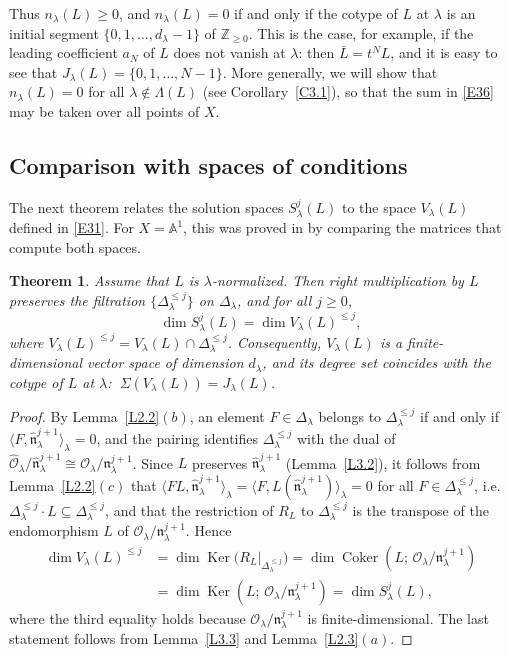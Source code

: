 \documentclass[11pt,reqno]{amsart}
\theoremstyle{plain}
\newtheorem{theorem}{Theorem}[section]
\theoremstyle{definition}
\theoremstyle{remark}
\numberwithin{equation}{section}
\newcommand{\cO}{\mathcal{O}}
\newcommand{\Z}{\mathbb{Z}}
\newcommand{\A}{\mathbb{A}}
\newcommand{\fn}{\mathfrak{n}}
\newcommand{\nl}{\mathfrak{n}_\lambda}
\newcommand{\hO}{\widehat{\cO}}
\newcommand{\hn}{\widehat{\fn}}
\newcommand{\Dl}{\Delta_\lambda}
\newcommand{\lan}{\langle}
\newcommand{\ran}{\rangle}
\DeclareMathOperator{\Ker}{Ker}
\DeclareMathOperator{\Coker}{Coker}
\begin{document}
Thus $n_\lambda(L) \ge 0$, and $n_\lambda(L) = 0$ if and only if the cotype of $L$ at $\lambda$ is
an initial segment $\{0, 1, \ldots, d_\lambda - 1\}$ of $\Z_{\ge 0}$. This is the case, for
example, if the leading coefficient $a_N$ of $L$ does not vanish at $\lambda$: then
$\bar L = t^N L$, and it is easy to see that $J_\lambda(L) = \{0, 1, \ldots, N-1\}$. More
generally, we will show that $n_\lambda(L) = 0$ for all $\lambda \notin \Lambda(L)$ (see
Corollary~\ref{C3.1}), so that the sum in \eqref{E36} may be taken over all points of $X$.

\subsection{Comparison with spaces of conditions}
\label{S3.4}
The next theorem relates the solution spaces $S^j_\lambda(L)$ to the space $V_\lambda(L)$ defined
in \eqref{E31}. For $X = \A^1$, this was proved in \cite[Section~4]{Tsai} by comparing the
matrices that compute both spaces.

\begin{theorem}
\label{T3.1}
Assume that $L$ is $\lambda$-normalized. Then right multiplication by $L$ preserves the filtration
$\{\Dl^{\le j}\}$ on $\Dl$, and for all $j \ge 0$,
\[
  \dim S^j_\lambda(L) = \dim V_\lambda(L)^{\le j} ,
\]
where $V_\lambda(L)^{\le j} = V_\lambda(L) \cap \Dl^{\le j}$. Consequently, $V_\lambda(L)$ is a
finite-dimensional vector space of dimension $d_\lambda$, and its degree set coincides with the
cotype of $L$ at $\lambda$: $\ \Sigma(V_\lambda(L)) = J_\lambda(L)$.
\end{theorem}

\begin{proof}
By Lemma~\ref{L2.2}$(b)$, an element $F \in \Dl$ belongs to $\Dl^{\le j}$ if and only if
$\lan F, \hn^{j+1}_\lambda \ran_\lambda = 0$, and the pairing identifies $\Dl^{\le j}$ with the
dual of $\hO_\lambda/\hn_\lambda^{j+1} \cong \cO_\lambda/\nl^{j+1}$. Since $L$ preserves
$\hn^{j+1}_\lambda$ (Lemma~\ref{L3.2}), it follows from Lemma~\ref{L2.2}$(c)$ that
$\lan F L, \hn^{j+1}_\lambda\ran_\lambda = \lan F, L(\hn^{j+1}_\lambda) \ran_\lambda = 0$ for all
$F \in \Dl^{\le j}$, i.e.\ $\Dl^{\le j} \cdot L \subseteq \Dl^{\le j}$, and that the restriction
of $R_L$ to $\Dl^{\le j}$ is the transpose of the endomorphism $L$ of $\cO_\lambda/\nl^{j+1}$.
Hence
\begin{align*}
  \dim V_\lambda(L)^{\le j} & = \dim \Ker\bigl(R_L |_{\Dl^{\le j}}\bigr) = \dim \Coker(L;\,
  \cO_\lambda/\nl^{j+1}) \\
  & = \dim \Ker(L;\, \cO_\lambda/\nl^{j+1}) = \dim S^j_\lambda(L) ,
\end{align*}
where the third equality holds because $\cO_\lambda/\nl^{j+1}$ is finite-dimensional. The last
statement follows from Lemma~\ref{L3.3} and Lemma~\ref{L2.3}$(a)$.
\end{proof}
\end{document}
